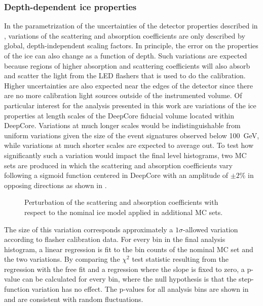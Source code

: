 \subsubsection{Depth-dependent ice properties}
\label{sec:depth-dependent-ice-properties}

In the parametrization of the uncertainties of the detector properties described in , variations of the scattering and absorption coefficients are only described by global, depth-independent scaling factors.
In principle, the error on the properties of the ice can also change as a function of depth.
Such variations are expected because regions of higher absorption and scattering coefficients will also absorb and scatter the light from the LED flashers that is used to do the calibration.
Higher uncertainties are also expected near the edges of the detector since there are no more calibration light sources outside of the instrumented volume.
Of particular interest for the analysis presented in this work are variations of the ice properties at length scales of the DeepCore fiducial volume located within DeepCore.
Variations at much longer scales would be indistinguishable from uniform variations given the size of the event signatures observed below 100~GeV, while variations at much shorter scales are expected to average out.
To test how significantly such a variation would impact the final level histograms, two MC sets are produced in which the scattering and absorption coefficients vary following a sigmoid function centered in DeepCore with an amplitude of $\pm 2\%$ in opposing directions as shown in .
\begin{figure}
    \centering
    
    \caption{Perturbation of the scattering and absorption coefficients with respect to the nominal ice model applied in additional MC sets.}
    \label{fig:step-function-ice-model}
\end{figure}
The size of this variation corresponds approximately a $1\sigma$-allowed variation according to flasher calibration data.
For every bin in the final analysis histogram, a linear regression is fit to the bin counts of the nominal MC set and the two variations.
By comparing the $\chi^2$ test statistic resulting from the regression with the free fit and a regression where the slope is fixed to zero, a p-value can be calculated for every bin, where the null hypothesis is that the step-function variation has no effect.
The p-values for all analysis bins are shown in  and are consistent with random fluctuations.
